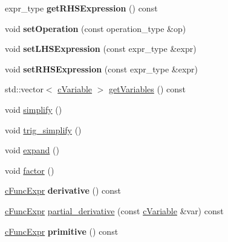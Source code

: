 \begin{DoxyCompactItemize}
\item 
\hypertarget{classcFuncExpr_a0233b69abbaf1bf2090f74e124d5ba8d}{expr\-\_\-type {\bfseries get\-R\-H\-S\-Expression} () const }\label{classcFuncExpr_a0233b69abbaf1bf2090f74e124d5ba8d}

\item 
\hypertarget{classcFuncExpr_a418cd662a3e19f7af280c6359cb55e07}{void {\bfseries set\-Operation} (const operation\-\_\-type \&op)}\label{classcFuncExpr_a418cd662a3e19f7af280c6359cb55e07}

\item 
\hypertarget{classcFuncExpr_a7cf0fedd521acb4eaa4964a361fe89b3}{void {\bfseries set\-L\-H\-S\-Expression} (const expr\-\_\-type \&expr)}\label{classcFuncExpr_a7cf0fedd521acb4eaa4964a361fe89b3}

\item 
\hypertarget{classcFuncExpr_a1f1404af450d7d475047f050895d8723}{void {\bfseries set\-R\-H\-S\-Expression} (const expr\-\_\-type \&expr)}\label{classcFuncExpr_a1f1404af450d7d475047f050895d8723}

\item 
std\-::vector$<$ \hyperlink{classcVariable}{c\-Variable} $>$ \hyperlink{classcFuncExpr_aac4a25067ca6be3db2ba9e95501d136a}{get\-Variables} () const 
\item 
void \hyperlink{classcFuncExpr_a1e4d0890110908c3cfe17f390016074b}{simplify} ()
\item 
void \hyperlink{classcFuncExpr_a4f38c136189c0af3e361e4af67524664}{trig\-\_\-simplify} ()
\item 
void \hyperlink{classcFuncExpr_a54fb36206df1ca39175c4ef914f9b671}{expand} ()
\item 
void \hyperlink{classcFuncExpr_af00d2b6a18cea571adeebd1e8d986d6e}{factor} ()
\item 
\hypertarget{classcFuncExpr_a7c783da6cbbff4ab740d830a4b14cfd6}{\hyperlink{classcFuncExpr}{c\-Func\-Expr} {\bfseries derivative} () const }\label{classcFuncExpr_a7c783da6cbbff4ab740d830a4b14cfd6}

\item 
\hyperlink{classcFuncExpr}{c\-Func\-Expr} \hyperlink{classcFuncExpr_acc82c5fcb2cc98fdc8a6ec376a0e76d7}{partial\-\_\-derivative} (const \hyperlink{classcVariable}{c\-Variable} \&var) const 
\item 
\hypertarget{classcFuncExpr_a0cc206609ae5661f8975c3b71a50c530}{\hyperlink{classcFuncExpr}{c\-Func\-Expr} {\bfseries primitive} () const }\label{classcFuncExpr_a0cc206609ae5661f8975c3b71a50c530}


\end{DoxyCompactItemize}
